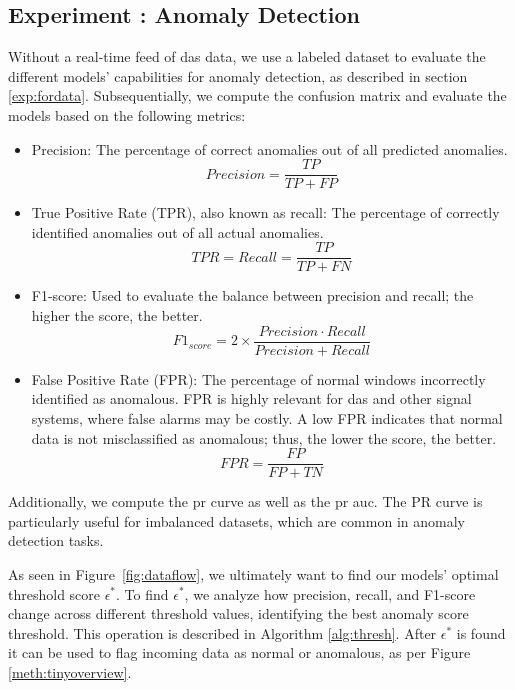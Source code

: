 \subsection{Experiment : Anomaly Detection}
Without a real-time feed of \acrshort{das} data, we use a labeled dataset to evaluate the different models' capabilities for anomaly detection, as described in section \ref{exp:fordata}. Subsequentially, we compute the confusion matrix and evaluate the models based on the following metrics:

\begin{itemize}
    \item Precision: The percentage of correct anomalies out of all predicted anomalies.
    \begin{equation}
        Precision = \frac{TP}{TP + FP}
    \end{equation}

    \item True Positive Rate (TPR), also known as recall: The percentage of correctly identified anomalies out of all actual anomalies.
    \begin{equation}
        TPR = Recall = \frac{TP}{TP + FN}
    \end{equation}

    \item F1-score: Used to evaluate the balance between precision and recall; the higher the score, the better. 
    \begin{equation}
        F1_{score} = 2 \times \frac{Precision \cdot Recall}{Precision + Recall}
    \end{equation}

    \item False Positive Rate (FPR): The percentage of normal windows incorrectly identified as anomalous. FPR is highly relevant for \acrshort{das} and other signal systems, where false alarms may be costly. A low FPR indicates that normal data is not misclassified as anomalous; thus, the lower the score, the better.
    \begin{equation}
        FPR = \frac{FP}{FP + TN}
    \end{equation}
\end{itemize}

Additionally, we compute the \acrfull{pr} curve as well as the \acrshort{pr} \acrfull{auc}. The PR curve is particularly useful for imbalanced datasets, which are common in anomaly detection tasks.

As seen in Figure~\ref{fig:dataflow}, we ultimately want to find our models' optimal threshold score $\epsilon^*$. To find $\epsilon^*$, we analyze how precision, recall, and F1-score change across different threshold values, identifying the best anomaly score threshold. This operation is described in Algorithm \ref{alg:thresh}. After $\epsilon^*$ is found it can be used to flag incoming data as normal or anomalous, as per Figure \ref{meth:tinyoverview}.

